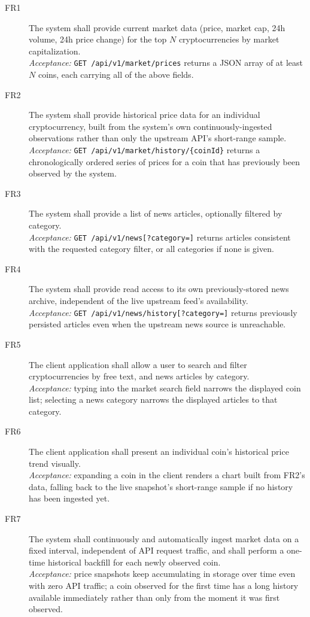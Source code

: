 \documentclass{scrartcl}
\begin{document}
\begin{description}
  \item[FR1] The system shall provide current market data (price, market cap, 24h volume, 24h
  price change) for the top $N$ cryptocurrencies by market capitalization. \\
  \emph{Acceptance:} \texttt{GET /api/v1/market/prices} returns a JSON array of at least $N$
  coins, each carrying all of the above fields.

  \item[FR2] The system shall provide historical price data for an individual cryptocurrency,
  built from the system's own continuously-ingested observations rather than only the upstream
  API's short-range sample. \\
  \emph{Acceptance:} \texttt{GET /api/v1/market/history/\{coinId\}} returns a chronologically
  ordered series of prices for a coin that has previously been observed by the system.

  \item[FR3] The system shall provide a list of news articles, optionally filtered by category. \\
  \emph{Acceptance:} \texttt{GET /api/v1/news[?category=]} returns articles consistent with the
  requested category filter, or all categories if none is given.

  \item[FR4] The system shall provide read access to its own previously-stored news archive,
  independent of the live upstream feed's availability. \\
  \emph{Acceptance:} \texttt{GET /api/v1/news/history[?category=]} returns previously persisted
  articles even when the upstream news source is unreachable.

  \item[FR5] The client application shall allow a user to search and filter cryptocurrencies by
  free text, and news articles by category. \\
  \emph{Acceptance:} typing into the market search field narrows the displayed coin list;
  selecting a news category narrows the displayed articles to that category.

  \item[FR6] The client application shall present an individual coin's historical price trend
  visually. \\
  \emph{Acceptance:} expanding a coin in the client renders a chart built from FR2's data,
  falling back to the live snapshot's short-range sample if no history has been ingested yet.

  \item[FR7] The system shall continuously and automatically ingest market data on a fixed
  interval, independent of API request traffic, and shall perform a one-time historical backfill
  for each newly observed coin. \\
  \emph{Acceptance:} price snapshots keep accumulating in storage over time even with zero API
  traffic; a coin observed for the first time has a long history available immediately rather
  than only from the moment it was first observed.
\end{description}
\end{document}
